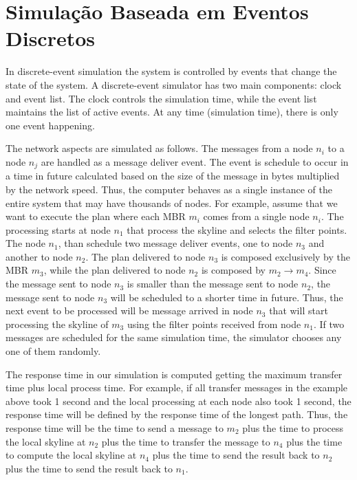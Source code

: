 
\chapter{Simulação Baseada em Eventos Discretos}\label{app:simulacao}

In discrete-event simulation the system is controlled by events that change the state of the system. A discrete-event simulator has two main components: clock and event list. The clock controls the simulation time, while the event list maintains the list of active events. At any time (simulation time), there is only one event happening. 

The network aspects are simulated as follows. The messages from a node $n_i$ to a node $n_j$ are handled as a message deliver event. The event is schedule to occur in a time in future calculated based on the size of the message in bytes multiplied by the network speed. Thus, the computer behaves as a single instance of the entire system that may have thousands of nodes. For example, assume that we want to execute the plan where each MBR $m_i$ comes from a single node $n_i$. The processing starts at node $n_1$ that process the skyline and selects the filter points. The node $n_1$, than schedule two message deliver events, one to node $n_3$ and another to node $n_2$. The plan delivered to node $n_3$ is composed exclusively by the MBR $m_3$, while the plan delivered to node $n_2$ is composed by $m_2 \rightarrow m_4$. Since the message sent to node $n_3$ is smaller than the message sent to node $n_2$, the message sent to node $n_3$ will be scheduled to a shorter time in future. Thus, the next event to be processed will be message arrived in node $n_3$ that will start processing the skyline of $m_3$ using the filter points received from node $n_1$. If two messages are scheduled for the same simulation time, the simulator chooses any one of them randomly. 

The response time in our simulation is computed getting the maximum transfer time plus local process time. For example, if all transfer messages in the example above took 1 second and the local processing at each node also took 1 second, the response time will be defined by the response time of the longest path. Thus, the response time will be the time to send a message to $m_2$ plus the time to process the local skyline at $n_2$ plus the time to transfer the message to $n_4$  plus the time to compute the local skyline at $n_4$ plus the time to send the result back to $n_2$ plus the time to send the result back to $n_1$. 


